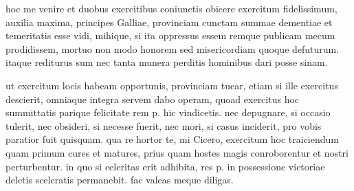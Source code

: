  hoc me venire et duobus exercitibus coniunctis obicere exercitum fidelissimum, auxilia maxima, principes Galliae, provinciam cunctam summae dementiae et temeritatis esse vidi, mihique, si ita oppressus essem remque publicam mecum prodidissem, mortuo non modo honorem sed misericordiam quoque defuturum. itaque rediturus sum nec tanta munera perditis hominibus dari posse sinam.

 ut exercitum locis habeam opportunis, provinciam tuear, etiam si ille exercitus descierit, omniaque integra servem dabo operam, quoad exercitus hoc summittatis parique felicitate rem p. hic vindicetis. nec depugnare, si occasio tulerit, nec obsideri, si necesse fuerit, nec mori, si casus inciderit, pro vobis paratior fuit quisquam. qua re hortor te, mi Cicero, exercitum hoc traiciendum quam primum cures et matures, prius quam hostes magis conroborentur et nostri perturbentur. in quo si celeritas erit adhibita, res p. in possessione victoriae deletis sceleratis permanebit. fac valeas meque diligas.
